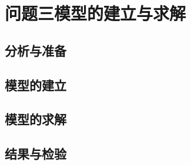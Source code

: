 \section{问题三模型的建立与求解}

\subsection{分析与准备}

\subsection{模型的建立}

\subsection{模型的求解}

\subsection{结果与检验}
